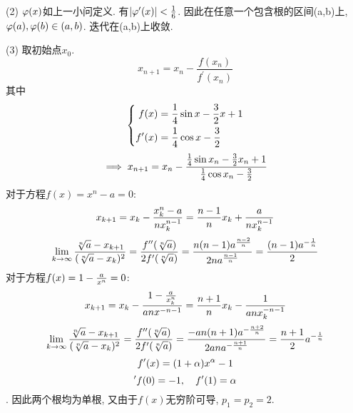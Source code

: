 \documentclass[UTF8,9pt]{ctexart}
\begin{document}
(2)  $\varphi(x)$如上一小问定义. 有$|\varphi'(x)|<\frac{1}{6}$. 因此在任意一个包含根的区间(a,b)上, $\varphi(a),\varphi(b)\in(a,b)$. 迭代在(a,b)上收敛. 

(3)  取初始点$x_0$. 
$$ 
x_{n+1}=x_{n}-\frac{f\left(x_{n}\right)}{f^{\prime}\left(x_{n}\right)}
 $$
其中
$$\left\{\begin{aligned} 
        f(x) &= \frac{1}{4} \sin x-\frac{3}{2} x+1\\
        f'(x) &= \frac{1}{4}\cos x-\frac{3}{2}
 \end{aligned}\right.$$
$$\implies x_{n+1} = x_n- \frac{\frac{1}{4} \sin x_n-\frac{3}{2} x_n+1}{\frac{1}{4}\cos x_n-\frac{3}{2}}$$
对于方程$f(x)=x^{n}-a=0$: 
$$x_{k+1} = x_k-\frac{x_k^n-a}{nx_k^{n-1}} = \frac{n-1}{n}x_k+\frac{a}{nx_k^{n-1}}$$
$$\lim_{k\to\infty}\frac{\sqrt[n]{a}-x_{k+1}}{(\sqrt[n]{a}-x_k)^2} = \frac{f''(\sqrt[n]{a})}{2f'(\sqrt[n]{a})} = \frac{n(n-1)a^{\frac{n-2}{n}}}{2na^{\frac{n-1}{n}}} = \frac{(n-1)a^{-\frac{1}{n}}}{2}$$
对于方程$f(x)=1-\frac{a}{x^n}=0$:
$$x_{k+1} = x_k - \frac{1-\frac{a}{x_k^n}}{anx^{-n-1}} = \frac{n+1}{n}x_k-\frac{1}{anx_k^{-n-1}}$$
$$\lim_{k\to\infty}\frac{\sqrt[n]{a}-x_{k+1}}{(\sqrt[n]{a}-x_k)^2} = \frac{f''(\sqrt[n]{a})}{2f'(\sqrt[n]{a})} = \frac{-an(n+1)a^{-\frac{n+2}{n}}}{2ana^{-\frac{n+1}{n}}} = \frac{n+1}{2}a^{-\frac{1}{n}}$$
$$f'(x) = (1+\alpha) x^\alpha -1$$
$$'f(0) = -1,\quad f'(1) = \alpha$$.
因此两个根均为单根, 又由于$f(x)$无穷阶可导, $p_1=p_2=2$.
\end{document}
